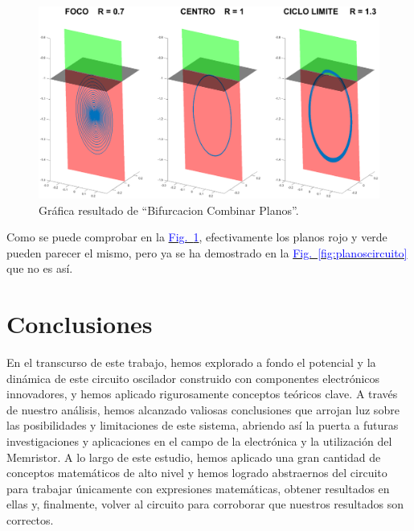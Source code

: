 \documentclass[12pt,a4paper]{report} %
\newcommand{\fref}[1]{\hyperref[#1]{\textcolor{blue}{Fig.~\ref*{#1}}}}
\newcommand{\fref}[1]{\hyperref[#1]{\textcolor{blue}{\textit{Fig.~\ref*{#1}}}}}
\begin{document}
	\vspace{0.5cm}
	
	\newpage
	
	\vspace{0.5cm}
	
	\newpage
	
	\begin{figure}[h]
		\centering
		\includegraphics[width=1.3\textwidth,center]{3planoscircuito.eps}
		\caption{Gráfica resultado de ``Bifurcacion Combinar Planos''.}
		\label{fig:3planoscircuito}
	\end{figure}\smallskip
	
	\vspace{0.5cm} Como se puede comprobar en la \fref{fig:3planoscircuito}, efectivamente los planos rojo y verde pueden parecer el mismo, pero ya se ha demostrado en la \fref{fig:planoscircuito} que no es así.
	
	\newpage
	
	\chapter*{Conclusiones}
	
	En el transcurso de este trabajo, hemos explorado a fondo el potencial y la dinámica de este circuito oscilador construido con componentes electrónicos innovadores, y hemos aplicado rigurosamente conceptos teóricos clave. A través de nuestro análisis, hemos alcanzado valiosas conclusiones que arrojan luz sobre las posibilidades y limitaciones de este sistema, abriendo así la puerta a futuras investigaciones y aplicaciones en el campo de la electrónica y la utilización del Memristor. A lo largo de este estudio, hemos aplicado una gran cantidad de conceptos matemáticos de alto nivel y hemos logrado abstraernos del circuito para trabajar únicamente con expresiones matemáticas, obtener resultados en ellas y, finalmente, volver al circuito para corroborar que nuestros resultados son correctos.
	
\end{document}
